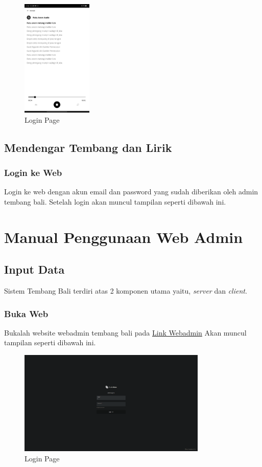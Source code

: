 \begin{figure}[H]
    \centering
    \includegraphics[width=0.3\textwidth]{assets/lyric.jpg}
    \caption{Login Page}
\end{figure}

\subsection{Mendengar Tembang dan Lirik}
\subsubsection{Login ke Web}
Login ke web dengan akun email dan password yang sudah diberikan oleh admin tembang bali.
Setelah login akan muncul tampilan seperti dibawah ini.
\section{Manual Penggunaan Web Admin}

\subsection{Input Data}
Sistem Tembang Bali terdiri atas 2 komponen utama yaitu, \textit{server} dan \textit{client}.

\subsubsection{Buka Web}
Bukalah website webadmin tembang bali pada \href{https://tembang.fuwuna.tech/_}{Link Webadmin}
Akan muncul tampilan seperti dibawah ini.

\begin{figure}[H]
    \centering
    \includegraphics[width=0.8\textwidth]{assets/webview.png}
    \caption{Login Page}
\end{figure}

